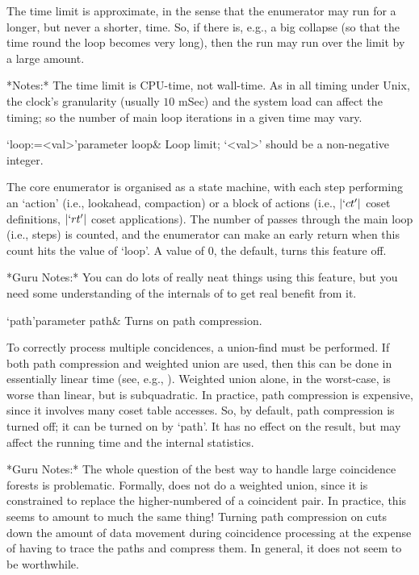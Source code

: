 The time  limit is approximate, in  the sense that  the enumerator may
run for a longer, but never a shorter, time.  So, if there is, e.g., a
big collapse (so that the time round the loop becomes very long), then
the run may run over the limit by a large amount.

*Notes:*
The time  limit is  CPU-time, not wall-time.   As in all  timing under
Unix, the clock's granularity (usually  $10$ mSec) and the system load
can affect  the timing;  so the  number of main  loop iterations  in a
given time may vary.

\>`loop:=<val>'{parameter loop}&
Loop limit; `<val>' should be a non-negative integer.

The core enumerator is organised as a state machine, with each step
performing an \lq action' (i.e., lookahead, compaction) or a block of
actions (i.e., $|`ct'|$ coset definitions, $|`rt'|$ coset applications).
The number of passes through the main loop (i.e., steps) is counted, and
the enumerator can make an early return when this count hits the
value of `loop'.
A value of $0$, the default, turns this feature off.

*Guru Notes:*
You can do lots of really neat things using this feature, but you need
some understanding of the internals of {\ACE} to get real benefit from
it.

\>`path'{parameter path}&
Turns on path compression.

To  correctly  process  multiple  concidences, a  union-find  must  be
performed.  If both path compression and weighted union are used, then
this can be  done in essentially linear time  (see, e.g., \cite{CLR90}).
Weighted union alone, in the  worst-case, is worse than linear, but is
subquadratic.  In  practice, path  compression is expensive,  since it
involves many coset table  accesses.  So, by default, path compression
is turned off; it can be turned on by `path'.  It has no effect on the
result, but may affect the running time and the internal statistics.

*Guru Notes:*
The whole question of the best way to handle large coincidence forests
is problematic.  Formally, {\ACE} does  not do a weighted union, since
it is constrained to replace the higher-numbered of a coincident pair.
In practice,  this seems  to amount to  much the same  thing!  Turning
path  compression on  cuts down  the  amount of  data movement  during
coincidence processing at the expense of having to trace the paths and
compress them.  In general, it does not seem to be worthwhile.


